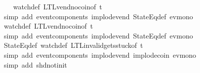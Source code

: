 \begin{isabellebody}
{\ \ \isamarkupfalse%
\ watch{\isacharunderscore}def\ LTL{\isacharunderscore}vend{\isacharunderscore}no{\isacharunderscore}coin{\isacharbrackleft}of\ t{\isacharbrackright}\isanewline
\ \ \ \ \ \isamarkupfalse%
\ {\isacharparenleft}simp\ add{\isacharcolon}\ event{\isacharunderscore}components\ implode{\isacharunderscore}vend\ StateEq{\isacharunderscore}def\ ev{\isacharunderscore}mono{\isacharparenright}\isanewline
\ \ \isamarkupfalse%
\ watch{\isacharunderscore}def\ LTL{\isacharunderscore}vend{\isacharunderscore}no{\isacharunderscore}coin{\isacharbrackleft}of\ t{\isacharbrackright}\isanewline
\ \ \ \ \isamarkupfalse%
\ {\isacharparenleft}simp\ add{\isacharcolon}\ event{\isacharunderscore}components\ implode{\isacharunderscore}vend\ StateEq{\isacharunderscore}def\ ev{\isacharunderscore}mono{\isacharparenright}\isanewline
\ \ \isamarkupfalse%
\ StateEq{\isacharunderscore}def\ watch{\isacharunderscore}def\ LTL{\isacharunderscore}invalid{\isacharunderscore}gets{\isacharunderscore}stuck{\isacharunderscore}{}{\isacharbrackleft}of\ t{\isacharbrackright}\isanewline
\ \ \ \isamarkupfalse%
\ {\isacharparenleft}simp\ add{\isacharcolon}\ event{\isacharunderscore}components\ implode{\isacharunderscore}vend\ implode{\isacharunderscore}coin\ ev{\isacharunderscore}mono{\isacharparenright}\isanewline
\ \ \isamarkupfalse%
\ {\isacharparenleft}simp\ add{\isacharcolon}\ shd{\isacharunderscore}not{\isacharunderscore}init{\isacharparenright}%
\endisatagproof
{\isafoldproof}%
%
\isadelimproof
%
\endisadelimproof
%
}%
%
\isadelimtheory
%
\endisadelimtheory
%
\isatagtheory
{}\isamarkupfalse%
%
\endisatagtheory
{\isafoldtheory}%
%
\isadelimtheory
%
\endisadelimtheory
%
\end{isabellebody}%
\endinput
